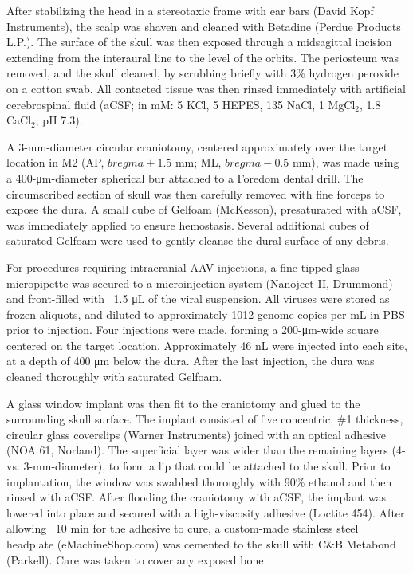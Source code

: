 After stabilizing the head in a stereotaxic frame with ear bars (David Kopf Instruments), the scalp was shaven and cleaned with Betadine (Perdue Products L.P.). The surface of the skull was then exposed through a midsagittal incision extending from the interaural line to the level of the orbits. The periosteum was removed, and the skull cleaned, by scrubbing briefly with 3\% hydrogen peroxide on a cotton swab. All contacted tissue was then rinsed immediately with artificial cerebrospinal fluid (aCSF; in mM: 5 KCl, 5 HEPES, 135 NaCl, 1 MgCl$_2$, 1.8 CaCl$_2$; pH 7.3).

A 3-mm-diameter circular craniotomy, centered approximately over the target location in M2 (AP, $bregma + 1.5$ mm; ML, $bregma - 0.5$ mm), was made using a 400-\si{\um}-diameter spherical bur attached to a Foredom dental drill. The circumscribed section of skull was then carefully removed with fine forceps to expose the dura. A small cube of Gelfoam (McKesson), presaturated with aCSF, was immediately applied to ensure hemostasis. Several additional cubes of saturated Gelfoam were used to gently cleanse the dural surface of any debris.

For procedures requiring intracranial AAV injections, a fine-tipped glass micro\-pipette was secured to a microinjection system (Nanoject II, Drummond) and front-filled with ~1.5 \si{\uL} of the viral suspension. All viruses were stored as frozen aliquots, and diluted to approximately 1012 genome copies per mL in PBS prior to injection. Four injections were made, forming a 200-\si{\um}-wide square centered on the target location. Approximately 46 nL were injected into each site, at a depth of 400 \si{\um} below the dura. After the last injection, the dura was cleaned thoroughly with saturated Gelfoam.

A glass window implant was then fit to the craniotomy and glued to the surrounding skull surface. The implant consisted of five concentric, \#1 thickness, circular glass coverslips (Warner Instruments) joined with an optical adhesive (NOA 61, Norland). The superficial layer was wider than the remaining layers (4- vs. 3-mm-diameter), to form a lip that could be attached to the skull. Prior to implantation, the window was swabbed thoroughly with 90\% ethanol and then rinsed with aCSF. After flooding the craniotomy with aCSF, the implant was lowered into place and secured with a high-viscosity adhesive (Loctite 454). After allowing ~10 min for the adhesive to cure, a custom-made stainless steel headplate (eMachineShop.com) was cemented to the skull with C\&B Metabond (Parkell). Care was taken to cover any exposed bone.

